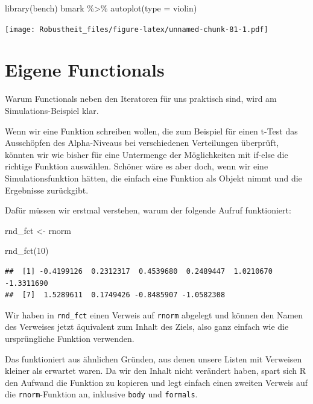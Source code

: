\documentclass[
]{book}
\newenvironment{Shaded}{\begin{snugshade}}{\end{snugshade}}
\newcommand{\AttributeTok}[1]{\textcolor[rgb]{0.77,0.63,0.00}{#1}}
\newcommand{\DecValTok}[1]{\textcolor[rgb]{0.00,0.00,0.81}{#1}}
\newcommand{\FunctionTok}[1]{\textcolor[rgb]{0.00,0.00,0.00}{#1}}
\newcommand{\NormalTok}[1]{#1}
\newcommand{\OtherTok}[1]{\textcolor[rgb]{0.56,0.35,0.01}{#1}}
\newcommand{\SpecialCharTok}[1]{\textcolor[rgb]{0.00,0.00,0.00}{#1}}
\newcommand{\StringTok}[1]{\textcolor[rgb]{0.31,0.60,0.02}{#1}}
\begin{document}
\begin{Shaded}
\begin{Highlighting}[]
\FunctionTok{library}\NormalTok{(bench)}
\NormalTok{bmark }\SpecialCharTok{\%\textgreater{}\%} 
  \FunctionTok{autoplot}\NormalTok{(}\AttributeTok{type =} \StringTok{\textquotesingle{}violin\textquotesingle{}}\NormalTok{)}
\end{Highlighting}
\end{Shaded}

\texttt{[image: Robustheit\_files/figure-latex/unnamed-chunk-81-1.pdf]}

\hypertarget{eigene-functionals}{%
\section{Eigene Functionals}\label{eigene-functionals}}

Warum Functionals neben den Iteratoren für uns praktisch sind, wird am Simulations-Beispiel klar.

Wenn wir eine Funktion schreiben wollen, die zum Beispiel für einen t-Test das Ausschöpfen des Alpha-Niveaus bei verschiedenen Verteilungen überprüft, könnten wir wie bisher für eine Untermenge der Möglichkeiten mit if-else die richtige Funktion auswählen.
Schöner wäre es aber doch, wenn wir eine Simulationsfunktion hätten, die einfach eine Funktion als Objekt nimmt und die Ergebnisse zurückgibt.

Dafür müssen wir erstmal verstehen, warum der folgende Aufruf funktioniert:

\begin{Shaded}
\begin{Highlighting}[]
\NormalTok{rnd\_fct }\OtherTok{\textless{}{-}}\NormalTok{ rnorm}

\FunctionTok{rnd\_fct}\NormalTok{(}\DecValTok{10}\NormalTok{)}
\end{Highlighting}
\end{Shaded}

\begin{verbatim}
##  [1] -0.4199126  0.2312317  0.4539680  0.2489447  1.0210670 -1.3311690
##  [7]  1.5289611  0.1749426 -0.8485907 -1.0582308
\end{verbatim}

Wir haben in \texttt{rnd\_fct} einen Verweis auf \texttt{rnorm} abgelegt und können den Namen des Verweises jetzt äquivalent zum Inhalt des Ziels, also ganz einfach wie die ursprüngliche Funktion verwenden.

Das funktioniert aus ähnlichen Gründen, aus denen unsere Listen mit Verweisen kleiner als erwartet waren. Da wir den Inhalt nicht verändert haben, spart sich R den Aufwand die Funktion zu kopieren und legt einfach einen zweiten Verweis auf die \texttt{rnorm}-Funktion an, inklusive \texttt{body} und \texttt{formals}.
\end{document}
